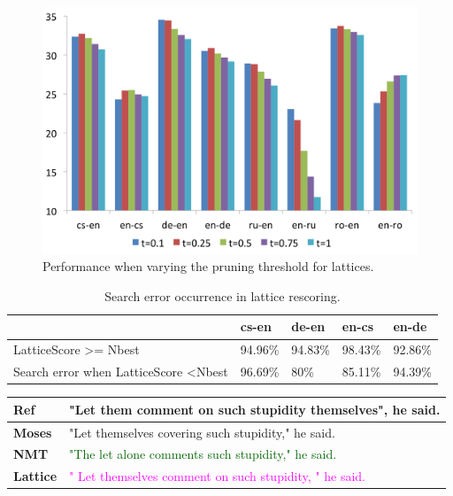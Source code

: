 \documentclass[landscape]{jhuslides3C}
\begin{document}
\begin{figure}
\begin{center}
\includegraphics[scale=0.7]{images/thresholds.png}
\caption{Performance when varying the pruning threshold for lattices.}
\end{center}
\end{figure}

\vspace{60mm}
\begin{table}
\centering
\begin{tabular}{|l|l|l|l|l|}
\hline
                                               & cs-en   & de-en   & en-cs   & en-de   \\ \hline
LatticeScore \textgreater= Nbest               & 94.96\% & 94.83\% & 98.43\% & 92.86\% \\ \hline
Search error when LatticeScore \textless Nbest & 96.69\% & 80\%    & 85.11\% & 94.39\% \\ \hline
\end{tabular}
\caption{Search error occurrence in lattice rescoring.}
\end{table}

\vspace{10mm}
\begin{center}
\begin{tabular}{|p{3cm}|p{20cm}|}
\textbf{Ref} & "Let them comment on such stupidity themselves", he said.\\[1cm] \hline \hline
\textbf{Moses} & \textcolor{verydarkorange}{"Let themselves covering such stupidity," he said.} \\[1cm] \hline \hline
\textbf{NMT} & \textcolor{darkgreen}{"The let alone comments such stupidity," he said.}\\[1cm] \hline \hline
\textbf{Lattice} & \textcolor{magenta}{" Let themselves comment on such stupidity, " he said.}
\end{tabular}
\end{center}
\end{document}
